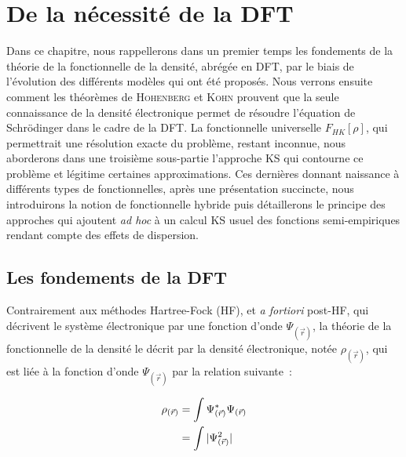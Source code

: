 	\section[DFT]{De la nécessité de la DFT}
	
	Dans ce chapitre, nous rappellerons dans un premier temps les fondements de la théorie de la fonctionnelle de la densité, abrégée en DFT, par le biais de l'évolution des différents modèles qui ont été proposés. Nous verrons ensuite comment les théorèmes de \textsc{Hohenberg} et \textsc{Kohn} prouvent que la seule connaissance de la densité électronique permet de résoudre l'équation de Schr\"{o}dinger dans le cadre de la DFT. La fonctionnelle universelle $F_{HK}[\rho]$, qui permettrait une résolution exacte du problème, restant inconnue, nous aborderons dans une troisième sous-partie l'approche KS qui contourne ce problème et légitime certaines approximations. Ces dernières donnant naissance à différents types de fonctionnelles, après une présentation succincte, nous introduirons la notion de fonctionnelle hybride puis détaillerons le principe des approches qui ajoutent \textit{ad hoc} à un calcul KS usuel des fonctions semi-empiriques rendant compte des effets de dispersion.
	
	\subsection{Les fondements de la DFT}
	
	Contrairement aux méthodes Hartree-Fock (HF), et \textit{a fortiori} post-HF, qui décrivent le système électronique par une fonction d'onde $\Psi_{(\vec{r})}$, la théorie de la fonctionnelle de la densité le décrit par la densité électronique, notée $\rho_{(\vec{r})}$, qui est liée à la fonction d'onde $\Psi_{(\vec{r})}$ par la relation suivante~:
	
	\begin{align}
	\rho_{(\vec{r})} &= \int \Psi_{(\vec{r})}^{*} \Psi_{(\vec{r})} \\
	&= \int |\Psi_{(\vec{r})}^{2}| \notag
	\end{align}
	
